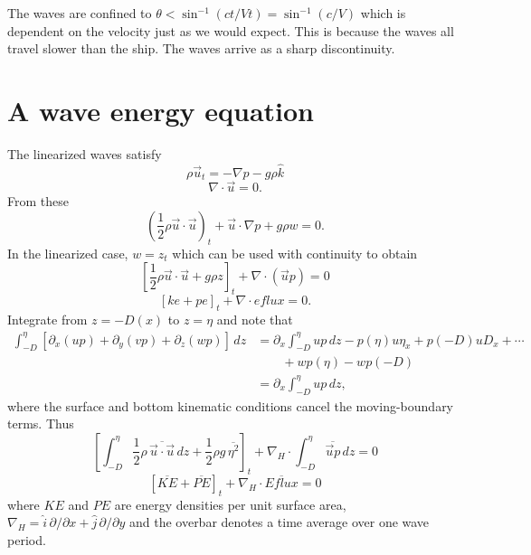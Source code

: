 
The waves are confined to $\theta<\sin^{-1}(ct/Vt)=\sin^{-1}(c/V)$ which is dependent on the velocity just as
we would expect. This is because the waves all travel slower than the ship. The waves
arrive as a sharp discontinuity.


\section{A wave energy equation}

The linearized waves satisfy
\[
	\rho\vec u_t=-\nabla p-g\rho\hat k
\]
\[
	\nabla\cdot\vec u=0.
\]
From these
\[
	\left(\frac12\rho\vec u\cdot\vec u\right)_t
	+\vec u\cdot\nabla p+g\rho w=0.
\]
In the linearized case, $w=z_t$ which can be used with continuity to obtain
\[
	\left[\frac12\rho\vec u\cdot\vec u+g\rho z\right]_t
	+\nabla\cdot(\vec u p)=0
\]
\[
	[ke+pe]_t+\nabla\cdot eflux=0.
\]
Integrate from $z=-D(x)$ to $z=\eta$ and note that
\begin{align*}
	\int_{-D}^{\eta}
	[\partial_x(up)+\partial_y(vp)+\partial_z(wp)]\,dz
	 & =\partial_x\int_{-D}^{\eta}up\,dz
	-p(\eta)u\eta_x+p(-D)uD_x+\cdots      \\
	 & \qquad +wp(\eta)-wp(-D)            \\
	 & =\partial_x\int_{-D}^{\eta}up\,dz,
\end{align*}
where the surface and bottom kinematic conditions cancel the moving-boundary terms.
Thus
\[
	\left[
		\int_{-D}^{\eta}\frac12\rho\,\overline{\vec u\cdot\vec u}\,dz
		+\frac12\rho g\,\overline{\eta^2}
		\right]_t
	+\nabla_H\cdot\int_{-D}^{\eta}\overline{\vec u p}\,dz=0
\]
\[
	[\overline{KE}+\overline{PE}]_t+\nabla_H\cdot\overline{Eflux}=0
\]
where $KE$ and $PE$ are energy densities per unit surface area,
$\nabla_H=\hat i\,\partial/\partial x+\hat j\,\partial/\partial y$ and the overbar
denotes a time average over one wave period.

